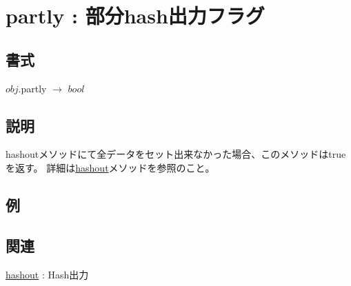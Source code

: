 
\section{partly : 部分hash出力フラグ\label{sect:partly}}
\subsection*{書式}
$obj$.partly $\rightarrow$ $bool$

\subsection*{説明}
hashoutメソッドにて全データをセット出来なかった場合、このメソッドはtrueを返す。
詳細は\hyperref[sect:hashout]{hashout}メソッドを参照のこと。

\subsection*{例}


\subsection*{関連}
\hyperref[sect:hashout]{hashout} : Hash出力


